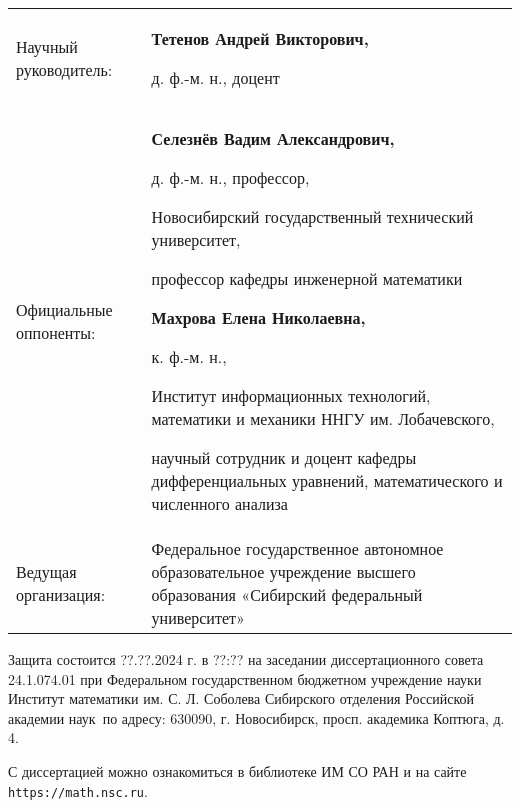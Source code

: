 \documentclass[a5paper,9pt,twoside]{extarticle} %
\begin{document}
\vspace{0.008\paperheight plus1fill}
\noindent%
\begin{tabular}{p{} p{}}
Научный руководитель: & \textbf{Тетенов Андрей Викторович,}\par
д. ф.-м. н., доцент

\vspace{0.013\paperheight}\\
Официальные оппоненты: &
{%
\textbf{Селезнёв Вадим Александрович,}\par
д. ф.-м. н., профессор,\par
Новосибирский государственный технический университет,\par
профессор кафедры инженерной математики\par
\vspace{0.01\paperheight}
\textbf{Махрова Елена Николаевна,}\par
к. ф.-м. н.,\par
Институт информационных технологий, математики и механики ННГУ им. Лобачевского,\par
научный сотрудник и доцент кафедры дифференциальных уравнений, математического и численного анализа

}%
\vspace{0.013\paperheight} \\
Ведущая организация: &
Федеральное государственное автономное образовательное учреждение высшего образования «Сибирский федеральный университет»
\end{tabular}
\vspace{0.008\paperheight plus1fill}

\noindent Защита состоится ??.??.2024 г. в ??:?? на заседании диссертационного совета 24.1.074.01 при Федеральном государственном бюджетном учреждение науки
Институт математики им. С. Л. Соболева Сибирского отделения Российской академии наук~по адресу: 630090, г. Новосибирск, просп. академика Коптюга, д. 4.

\vspace{0.008\paperheight plus1fill}
\noindent С диссертацией можно ознакомиться в библиотеке ИМ СО РАН и на сайте \texttt{https://math.nsc.ru}.

\end{document}
